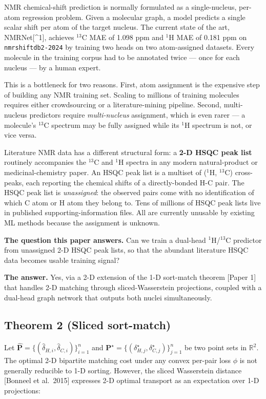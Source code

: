 \documentclass[11pt,a4paper]{article}
\begin{document}
NMR chemical-shift prediction is normally formulated as a single-nucleus, per-atom regression problem. Given a molecular graph, a model predicts a single scalar shift per atom of the target nucleus. The current state of the art, NMRNet{[}\^{}1{]}, achieves \(^{13}\)C MAE of 1.098 ppm and \(^{1}\)H MAE of 0.181 ppm on \texttt{nmrshiftdb2-2024} by training two heads on two atom-assigned datasets. Every molecule in the training corpus had to be annotated twice --- once for each nucleus --- by a human expert.

This is a bottleneck for two reasons. First, atom assignment is the expensive step of building any NMR training set. Scaling to millions of training molecules requires either crowdsourcing or a literature-mining pipeline. Second, multi-nucleus predictors require \emph{multi-nucleus} assignment, which is even rarer --- a molecule's \(^{13}\)C spectrum may be fully assigned while its \(^{1}\)H spectrum is not, or vice versa.

Literature NMR data has a different structural form: a \textbf{2-D HSQC peak list} routinely accompanies the \(^{13}\)C and \(^{1}\)H spectra in any modern natural-product or medicinal-chemistry paper. An HSQC peak list is a multiset of (\(^{1}\)H, \(^{13}\)C) cross-peaks, each reporting the chemical shifts of a directly-bonded H-C pair. The HSQC peak list is \emph{unassigned}: the observed pairs come with no identification of which C atom or H atom they belong to. Tens of millions of HSQC peak lists live in published supporting-information files. All are currently unusable by existing ML methods because the assignment is unknown.

\textbf{The question this paper answers.} Can we train a dual-head \(^{1}\)H/\(^{13}\)C predictor from unassigned 2-D HSQC peak lists, so that the abundant literature HSQC data becomes usable training signal?

\textbf{The answer.} Yes, via a 2-D extension of the 1-D sort-match theorem {[}Paper 1{]} that handles 2-D matching through sliced-Wasserstein projections, coupled with a dual-head graph network that outputs both nuclei simultaneously.

\subsection{Theorem 2 (Sliced sort-match)}\label{theorem-2-sliced-sort-match}

Let \(\hat{\mathbf{P}} = \{(\hat{\delta}_{H,i}, \hat{\delta}_{C,i})\}_{i=1}^n\) and \(\mathbf{P}^\star = \{(\delta^\star_{H,j}, \delta^\star_{C,j})\}_{j=1}^n\) be two point sets in \(\mathbb{R}^2\). The optimal 2-D bipartite matching cost under any convex per-pair loss \(\phi\) is not generally reducible to 1-D sorting. However, the sliced Wasserstein distance {[}Bonneel et al.~2015{]} expresses 2-D optimal transport as an expectation over 1-D projections:
\end{document}
